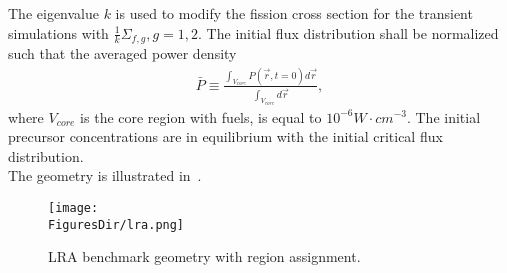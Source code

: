 The eigenvalue $k$ is used to modify the fission cross section for the transient simulations with $\frac{1}{k}\Sigma_{f,g}, g=1,2$.  The initial flux distribution shall be normalized such that the averaged power density
\begin{align}
\bar{P} \equiv \frac{\int_{V_{core}} P(\vec{r}, t=0) d\vec{r}}{\int_{V_{core}} d\vec{r}},
\end{align}
where $V_{core}$ is the core region with fuels, is equal to $10^{-6} W\cdot cm^{-3}$.
The initial precursor concentrations are in equilibrium with the initial critical flux distribution.\\

The geometry is illustrated in~.\\
\begin{figure}[!htbp]
\centering
\texttt{[image: \\FiguresDir/lra.png]}
\caption{LRA benchmark geometry with region assignment.}
\label{fig:lra-geometry}
\end{figure}

